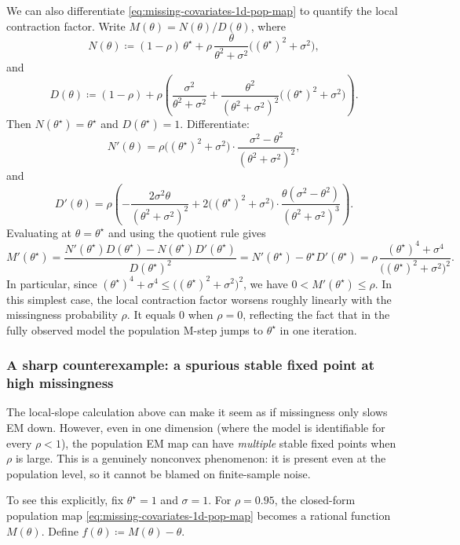 \documentclass[11pt]{article}
\begin{document}
We can also differentiate \eqref{eq:missing-covariates-1d-pop-map} to quantify the local contraction factor.
Write $M(\theta)=N(\theta)/D(\theta)$, where
\[
N(\theta) \coloneqq (1-\rho)\,\theta^\star + \rho\,\frac{\theta}{\theta^2+\sigma^2}\big((\theta^\star)^2+\sigma^2\big),
\]
and
\[
D(\theta)\coloneqq (1-\rho)+\rho\left(\frac{\sigma^2}{\theta^2+\sigma^2}
+\frac{\theta^2}{(\theta^2+\sigma^2)^2}\big((\theta^\star)^2+\sigma^2\big)\right).
\]
Then $N(\theta^\star)=\theta^\star$ and $D(\theta^\star)=1$.
Differentiate:
\[
N'(\theta)
=
\rho\big((\theta^\star)^2+\sigma^2\big)\cdot \frac{\sigma^2-\theta^2}{(\theta^2+\sigma^2)^2},
\]
and
\[
D'(\theta)
=
\rho\left(
-\frac{2\sigma^2\theta}{(\theta^2+\sigma^2)^2}
+2\big((\theta^\star)^2+\sigma^2\big)\cdot \frac{\theta(\sigma^2-\theta^2)}{(\theta^2+\sigma^2)^3}
\right).
\]
Evaluating at $\theta=\theta^\star$ and using the quotient rule gives
\[
M'(\theta^\star)
=
\frac{N'(\theta^\star)D(\theta^\star)-N(\theta^\star)D'(\theta^\star)}{D(\theta^\star)^2}
=
N'(\theta^\star)-\theta^\star D'(\theta^\star)
=
\rho\,\frac{(\theta^\star)^4+\sigma^4}{\big((\theta^\star)^2+\sigma^2\big)^2}.
\]
In particular, since $(\theta^\star)^4+\sigma^4 \le \big((\theta^\star)^2+\sigma^2\big)^2$, we have $0<M'(\theta^\star)\le \rho$.
In this simplest case, the local contraction factor worsens roughly linearly with the missingness probability $\rho$.
It equals $0$ when $\rho=0$, reflecting the fact that in the fully observed model the population M-step jumps to $\theta^\star$ in one iteration.

\subsubsection{A sharp counterexample: a spurious stable fixed point at high missingness}
\label{subsubsec:missing-covariates-spurious-fixed-point}

The local-slope calculation above can make it seem as if missingness only slows EM down.
However, even in one dimension (where the model is identifiable for every $\rho<1$), the population EM map can have \emph{multiple} stable fixed points when $\rho$ is large.
This is a genuinely nonconvex phenomenon: it is present even at the population level, so it cannot be blamed on finite-sample noise.

To see this explicitly, fix $\theta^\star=1$ and $\sigma=1$.
For $\rho=0.95$, the closed-form population map \eqref{eq:missing-covariates-1d-pop-map} becomes a rational function $M(\theta)$.
Define $f(\theta)\coloneqq M(\theta)-\theta$.
\end{document}
